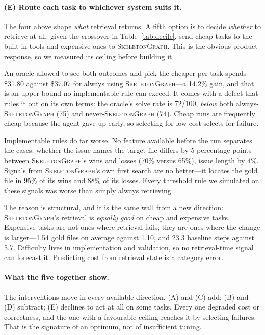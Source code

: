 \documentclass[11pt,letterpaper]{article}
\newcommand{\sg}{\textsc{SkeletonGraph}}
\begin{document}
\paragraph{(E) Route each task to whichever system suits it.}
The four above shape \emph{what} retrieval returns. A fifth option is to decide
\emph{whether} to retrieve at all: given the crossover in Table~\ref{tab:decile},
send cheap tasks to the built-in tools and expensive ones to \sg{}. This is the
obvious product response, so we measured its ceiling before building it.

An oracle allowed to see both outcomes and pick the cheaper per task spends
\$31.80 against \$37.07 for always using \sg{}---a 14.2\% gain, and that is an
upper bound no implementable rule can exceed. It comes with a defect that rules it
out on its own terms: the oracle's solve rate is 72/100, \emph{below} both always-
\sg{} (75) and never-\sg{} (74). Cheap runs are frequently cheap because the agent
gave up early, so selecting for low cost selects for failure.

Implementable rules do far worse. No feature available before the run separates
the cases: whether the issue names the target file differs by 5 percentage points
between \sg{}'s wins and losses (70\% versus 65\%), issue length by 4\%. Signals
from \sg{}'s own first search are no better---it locates the gold file in 95\% of
its wins and 88\% of its losses. Every threshold rule we simulated on these
signals was worse than simply always retrieving.

The reason is structural, and it is the same wall from a new direction:
\sg{}'s retrieval is \emph{equally good} on cheap and expensive tasks. Expensive
tasks are not ones where retrieval fails; they are ones where the change is
larger---1.54 gold files on average against 1.10, and 23.3 baseline steps against
5.7. Difficulty lives in implementation and validation, so no retrieval-time
signal can forecast it. Predicting cost from retrieval state is a category error.

\paragraph{What the five together show.}
The interventions move in every available direction. (A) and (C) add; (B) and (D)
subtract; (E) declines to act at all on some tasks. Every one degraded cost or
correctness, and the one with a favourable ceiling reaches it by selecting
failures. That is the signature of an optimum, not of insufficient tuning.
\end{document}
